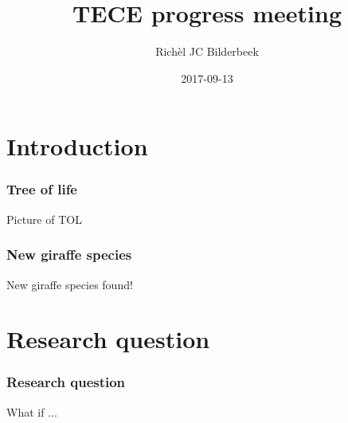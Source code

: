 \documentclass{beamer}
\title[]{TECE progress meeting}
\author[]{Rich\`{e}l JC Bilderbeek}
\institute[]{University of Groningen}
\date[]{2017-09-13}
\begin{document}
\frame{\titlepage}


\section[Section]{Introduction}

\begin{frame}
  \frametitle{Tree of life}

  Picture of TOL\footnotemark
\end{frame}


\begin{frame}
  \frametitle{New giraffe species}

  New giraffe species found!

\end{frame}

\section[Section]{Research question}

\begin{frame}
  \frametitle{Research question}

  What if ...
\end{frame}
\end{document}
